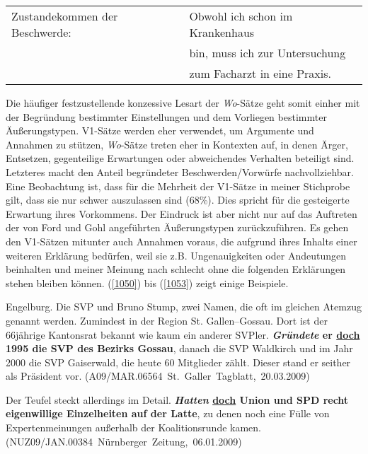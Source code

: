 {\begin{exe}
	\ex\label{1049} 
	\begin{tabular}[t]{ll}
	Zustandekommen der Beschwerde: & Obwohl ich schon im Krankenhaus \\
	& bin, muss ich zur Untersuchung \\
	& zum Facharzt in eine Praxis.
	\end{tabular}
\end{exe}
Die häufiger festzustellende konzessive Lesart der \textit{Wo}-Sätze geht somit einher mit der Begründung bestimmter Einstellungen und dem Vorliegen bestimmter Äußerungstypen. V1-Sätze werden eher verwendet, um Argumente und Annahmen zu stützen, \textit{Wo}-Sätze treten eher in Kontexten auf, in denen Ärger, Entsetzen, gegenteilige Erwartungen oder abweichendes Verhalten beteiligt sind. Letz\-teres macht den Anteil begründeter Beschwerden/Vorwürfe nachvollziehbar. Eine Beobachtung ist, dass für die Mehrheit der V1-Sätze in meiner Stichprobe gilt, dass sie nur schwer auszulassen sind (68\%). Dies spricht für die gesteigerte Erwartung ihres Vorkommens. Der Eindruck ist aber nicht nur auf das Auftreten der von Ford und Gohl angeführten Äußerungstypen zurückzuführen. Es gehen den V1-Sätzen mitunter auch Annahmen voraus, die aufgrund ihres Inhalts einer weiteren Erklärung bedürfen, weil sie z.B. Ungenauigkeiten oder Andeutungen beinhalten und meiner Mei\-nung nach schlecht ohne die folgenden Erklärungen stehen bleiben können. (\ref{1050}) bis (\ref{1053}) zeigt einige Beispiele.

\begin{exe}
	\ex\label{1050} 
	\scriptsize
	Engelburg. Die SVP und Bruno Stump, zwei Namen, die oft im gleichen Atemzug genannt werden. Zumindest in der Region St. Gallen–Gossau. Dort ist der 		66jährige Kantonsrat bekannt wie kaum ein anderer SVPler. \textbf{\textit{Gründete} er \underline{doch} 1995 die SVP des Bezirks Gossau}, danach die 		SVP Waldkirch und im Jahr 2000 die SVP Gaiserwald, die heute 60 Mitglieder zählt. Dieser stand er seither als Präsident vor.        
	\hfill\hbox {(A09/MAR.06564 St. Galler Tagblatt, 20.03.2009)}
\end{exe}

\begin{exe}
	\ex\label{1051} 
	\scriptsize
	Der Teufel steckt allerdings im Detail. \textbf{\textit{Hatten} \underline{doch} Union und SPD recht eigenwillige Einzelheiten auf der Latte}, zu denen 	noch eine Fülle von Expertenmeinungen außerhalb der Koalitionsrunde kamen.                 
	\hfill\hbox {(NUZ09/JAN.00384 Nürnberger Zeitung, 06.01.2009)}
\end{exe}                                              

}
